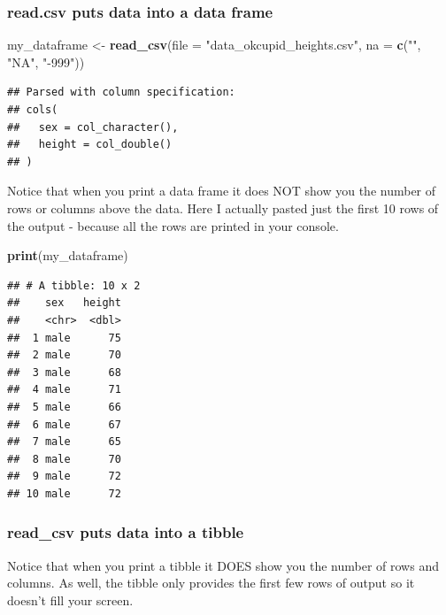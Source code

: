 \documentclass[
]{krantz}
\makeatletter
\newenvironment{Shaded}{\begin{snugshade}}{\end{snugshade}}
\newcommand{\DataTypeTok}[1]{\textcolor[rgb]{0.27,0.27,0.27}{#1}}
\newcommand{\KeywordTok}[1]{\textcolor[rgb]{0.27,0.27,0.27}{\textbf{#1}}}
\newcommand{\NormalTok}[1]{#1}
\newcommand{\StringTok}[1]{\textcolor[rgb]{0.5,0.5,0.5}{#1}}
\newenvironment{kframe}{%
\medskip{}
\setlength{\fboxsep}{.8em}
 \def\at@end@of@kframe{}%
 \ifinner\ifhmode%
  \def\at@end@of@kframe{\end{minipage}}%
  \begin{minipage}{\columnwidth}%
 \fi\fi%
 \def\FrameCommand##1{\hskip\@totalleftmargin \hskip-\fboxsep
 \colorbox{shadecolor}{##1}\hskip-\fboxsep
     \hskip-\linewidth \hskip-\@totalleftmargin \hskip\columnwidth}%
 \MakeFramed {\advance\hsize-\width
   \@totalleftmargin\z@ \linewidth\hsize
   \@setminipage}}%
 {\par\unskip\endMakeFramed%
 \at@end@of@kframe}
\renewenvironment{Shaded}{\begin{kframe}}{\end{kframe}}
\makeatother
\begin{document}
\hypertarget{read.csv-puts-data-into-a-data-frame}{%
\subsubsection{read.csv puts data into a data frame}\label{read.csv-puts-data-into-a-data-frame}}

\begin{Shaded}
\begin{Highlighting}[]
\NormalTok{my_dataframe <-}\StringTok{ }\KeywordTok{read_csv}\NormalTok{(}\DataTypeTok{file =} \StringTok{"data_okcupid_heights.csv"}\NormalTok{, }
                    \DataTypeTok{na =} \KeywordTok{c}\NormalTok{(}\StringTok{""}\NormalTok{, }\StringTok{"NA"}\NormalTok{, }\StringTok{"-999"}\NormalTok{))}
\end{Highlighting}
\end{Shaded}

\begin{verbatim}
## Parsed with column specification:
## cols(
##   sex = col_character(),
##   height = col_double()
## )
\end{verbatim}

Notice that when you print a data frame it does NOT show you the number of rows or columns above the data. Here I actually pasted just the first 10 rows of the output - because all the rows are printed in your console.

\begin{Shaded}
\begin{Highlighting}[]
\KeywordTok{print}\NormalTok{(my_dataframe)}
\end{Highlighting}
\end{Shaded}

\begin{verbatim}
## # A tibble: 10 x 2
##    sex   height
##    <chr>  <dbl>
##  1 male      75
##  2 male      70
##  3 male      68
##  4 male      71
##  5 male      66
##  6 male      67
##  7 male      65
##  8 male      70
##  9 male      72
## 10 male      72
\end{verbatim}

\hypertarget{read_csv-puts-data-into-a-tibble}{%
\subsubsection{read\_csv puts data into a tibble}\label{read_csv-puts-data-into-a-tibble}}

Notice that when you print a tibble it DOES show you the number of rows and columns. As well, the tibble only provides the first few rows of output so it doesn't fill your screen.
\end{document}
